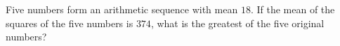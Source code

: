 Five numbers form an arithmetic sequence with mean $18$. If the mean of the squares of the five numbers is $374$, what is the greatest of the five original numbers?
